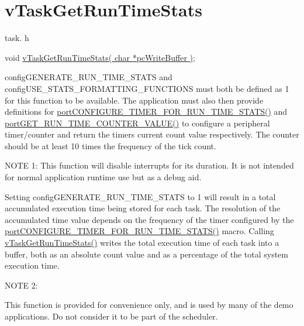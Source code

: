 \hypertarget{group__v_task_get_run_time_stats}{}\section{v\+Task\+Get\+Run\+Time\+Stats}
\label{group__v_task_get_run_time_stats}
task. h 
\begin{DoxyPre}void \hyperlink{task_8h_a52da9b427041a48dc9f6802e10f151d4}{vTaskGetRunTimeStats( char *pcWriteBuffer )};\end{DoxyPre}


config\+G\+E\+N\+E\+R\+A\+T\+E\+\_\+\+R\+U\+N\+\_\+\+T\+I\+M\+E\+\_\+\+S\+T\+A\+TS and config\+U\+S\+E\+\_\+\+S\+T\+A\+T\+S\+\_\+\+F\+O\+R\+M\+A\+T\+T\+I\+N\+G\+\_\+\+F\+U\+N\+C\+T\+I\+O\+NS must both be defined as 1 for this function to be available. The application must also then provide definitions for \hyperlink{_free_r_t_o_s_8h_a727939bcdb98501e0eba0ec8a1841e1b}{port\+C\+O\+N\+F\+I\+G\+U\+R\+E\+\_\+\+T\+I\+M\+E\+R\+\_\+\+F\+O\+R\+\_\+\+R\+U\+N\+\_\+\+T\+I\+M\+E\+\_\+\+S\+T\+A\+T\+S()} and \hyperlink{projects_2xpressohack_2_open_w_s_n___o_s_2src_2_free_r_t_o_s_config_8h_aa7cb8c79fb40bf2d4caccf5ba9ae6737}{port\+G\+E\+T\+\_\+\+R\+U\+N\+\_\+\+T\+I\+M\+E\+\_\+\+C\+O\+U\+N\+T\+E\+R\+\_\+\+V\+A\+L\+U\+E()} to configure a peripheral timer/counter and return the timers current count value respectively. The counter should be at least 10 times the frequency of the tick count.

N\+O\+TE 1\+: This function will disable interrupts for its duration. It is not intended for normal application runtime use but as a debug aid.

Setting config\+G\+E\+N\+E\+R\+A\+T\+E\+\_\+\+R\+U\+N\+\_\+\+T\+I\+M\+E\+\_\+\+S\+T\+A\+TS to 1 will result in a total accumulated execution time being stored for each task. The resolution of the accumulated time value depends on the frequency of the timer configured by the \hyperlink{_free_r_t_o_s_8h_a727939bcdb98501e0eba0ec8a1841e1b}{port\+C\+O\+N\+F\+I\+G\+U\+R\+E\+\_\+\+T\+I\+M\+E\+R\+\_\+\+F\+O\+R\+\_\+\+R\+U\+N\+\_\+\+T\+I\+M\+E\+\_\+\+S\+T\+A\+T\+S()} macro. Calling \hyperlink{task_8h_a52da9b427041a48dc9f6802e10f151d4}{v\+Task\+Get\+Run\+Time\+Stats()} writes the total execution time of each task into a buffer, both as an absolute count value and as a percentage of the total system execution time.

N\+O\+TE 2\+:

This function is provided for convenience only, and is used by many of the demo applications. Do not consider it to be part of the scheduler.

